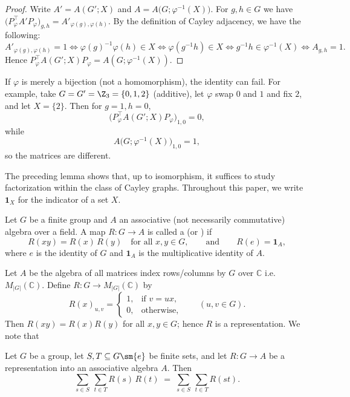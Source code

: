 \documentclass{file}
\begin{document}
\begin{proof}
Write $A'=A(G';X)$ and $A=A\bigl(G;\varphi^{-1}(X)\bigr)$.
For $g,h\in G$ we have
$\bigl(P_\varphi^{\!\top}A'P_\varphi\bigr)_{g,h}=A'_{\varphi(g),\varphi(h)}$.
By the definition of Cayley adjacency, we have the following:
\[
A'_{\varphi(g),\varphi(h)}=1 \iff \varphi(g)^{-1}\varphi(h)\in X
\iff \varphi(g^{-1}h)\in X
\iff g^{-1}h\in \varphi^{-1}(X)
\iff A_{g,h}=1.
\]
Hence $P_\varphi^{\!\top}A(G';X)P_\varphi = A(G;\varphi^{-1}(X))$.
\end{proof}

If $\varphi$ is merely a bijection (not a homomorphism), the identity can fail.
For example, take $G=G'=\Z_3=\{0,1,2\}$ (additive), let $\varphi$ swap $0$ and $1$ and fix $2$,
and let $X=\{2\}$. Then for $g=1,h=0$,
\[
\bigl(P_\varphi^{\!\top}A(G';X)P_\varphi\bigr)_{1,0}
=0,
\]
while
\[
A\bigl(G;\varphi^{-1}(X)\bigr)_{1,0}=1,
\]
so the matrices are different.


The preceding lemma shows that, up to isomorphism, it suffices to study factorization within the class of Cayley graphs.
Throughout this paper, we write $\mathbf 1_X$ for the indicator of a set $X$.


\begin{defn}
Let $G$ be a finite group and $A$ an associative (not necessarily commutative) algebra over a field.
A map $R\colon G\to A$ is called a  (or ) if
\[
R(xy)=R(x)\,R(y)\quad\text{for all }x,y\in G,\qquad\text{and}\qquad R(e)=\mathbf{1}_A,
\]
where $e$ is the identity of $G$ and $\mathbf{1}_A$ is the multiplicative identity of $A$.
\end{defn}


Let $A$  be the algebra of all matrices index rows/columns by $G$ over $\mathbb C$ i.e.  $M_{|G|}(\mathbb{C})$.
Define $R\colon G\to M_{|G|}(\mathbb{C})$ by
\[
R(x)_{u,v}=
\begin{cases}
1,&\text{if } v=ux,\\
0,&\text{otherwise},
\end{cases}
\qquad (u,v\in G).
\]
Then $R(xy)=R(x)R(y)$ for all $x,y\in G$; hence $R$ is a representation.
We note that 

\begin{lem}\label{lem:product}
Let $G$ be a group, let $S,T\subseteq G\sm \{e\}$ be finite sets, and let $R\colon G\to A$ be a representation into an associative algebra $A$.
Then
\[
\sum_{s\in S}\ \sum_{t\in T} R(s)\,R(t)
\;=\;
\sum_{s\in S}\ \sum_{t\in T} R(st).
\]
\end{lem}
\end{document}
